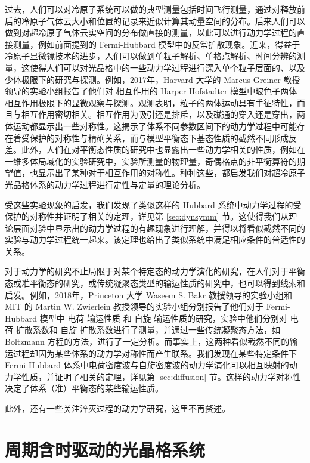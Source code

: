 过去，人们可以对冷原子系统可以做的典型测量包括时间飞行测量，通过对释放前后的冷原子气体云大小和位置的记录来近似计算其动量空间的分布。后来人们可以做到对超冷原子气体云实空间的分布做直接的测量，以此可以进行动力学过程的直接测量，例如前面提到的 Fermi-Hubbard 模型中的反常扩散现象\cite{hubbard-expan-2010,hubbard-expan-2012}。近来，得益于冷原子显微镜技术的进步，人们可以做到单粒子解析、单格点解析、时间分辨的测量，这使得人们可以对光晶格中的一些动力学过程进行深入单个粒子层面的、以及少体极限下的研究与探测。例如，2017年，Harvard 大学的 Marcus Greiner 教授领导的实验小组报告了他们对 相互作用的 Harper-Hofstadter 模型中玻色子两体相互作用极限下的显微观察与探测\cite{twobody-2017}。观测表明，粒子的两体运动具有手征特性，而且与相互作用密切相关。相互作用为吸引还是排斥，以及磁通的穿入还是穿出，两体运动都显示出一些对称性。这揭示了体系不同参数区间下的动力学过程中可能存在着受保护的对称性与精确关系，而与模型平衡态下基态性质的截然不同形成反差。此外，人们在对平衡态性质的研究中也显露出一些动力学相关的性质，例如在一维多体局域化的实验研究中\cite{mbl1d}，实验所测量的物理量，奇偶格点的非平衡算符的期望值，也显示出了某种对于相互作用的对称性。种种这些，都启发我们对超冷原子光晶格体系的动力学过程进行定性与定量的理论分析。

受这些实验现象的启发，我们发现了类似这样的 Hubbard 系统中动力学过程的受保护的对称性并证明了相关的定理，详见第 \ref{sec:dynsymm} 节。这使得我们从理论层面对验中显示出的动力学过程的有趣现象进行理解，并得以将看似截然不同的实验与动力学过程统一起来。该定理也给出了类似系统中满足相应条件的普适性的关系。

对于动力学的研究不止局限于对某个特定态的动力学演化的研究，在人们对于平衡态或准平衡态的研究，或传统凝聚态类型的输运性质的研究中，也可以得到线索和启发。例如，2018年，Princeton 大学 Waseem S. Bakr 教授领导的实验小组和 MIT 的 Martin W. Zwierlein 教授领导的实验小组分别报告了他们对于 Fermi-Hubbard 模型中 电荷 输运性质 和 自旋 输运性质的研究，实验中他们分别对 电荷 扩散系数和 自旋 扩散系数进行了测量，并通过一些传统凝聚态方法，如 Boltzmann 方程的方法，进行了一定分析。而事实上，这两种看似截然不同的输运过程却因为某些体系的动力学对称性而产生联系。我们发现在某些特定条件下 Fermi-Hubbard 体系中电荷密度波与自旋密度波的动力学演化可以相互映射的动力学性质，并证明了相关的定理，详见第 \ref{sec:diffusion} 节。这样的动力学对称性决定了体系（准）平衡态的某些输运性质。

此外，还有一些关注淬灭过程的动力学研究，这里不再赘述。



\section{周期含时驱动的光晶格系统}

